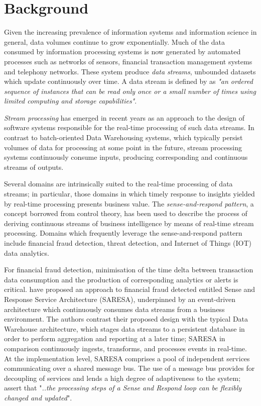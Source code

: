 \chapter{Background}

Given the increasing prevalence of information systems and information science in general, data volumes continue to grow exponentially\cite{Devakunchari}. Much of the data consumed by information processing systems is now generated by automated processes such as networks of sensors, financial transaction management systems and telephony networks. These system produce \textit{data streams}, unbounded datasets which update continuously over time. A data stream is defined by \citeauthor{data_stream_processing} as \textit{"an ordered sequence of instances that can be read only once or a small number of times using limited computing and storage capabilities"}\cite{data_stream_processing}.

\textit{Stream processing} has emerged in recent years as an approach to the design of software systems responsible for the real-time processing of such data streams\cite{Andrade:2014:FSP:2823980}. In contrast to batch-oriented Data Warehousing systems, which typically persist volumes of data for processing at some point in the future, stream processing systems continuously consume inputs, producing corresponding and continuous streams of outputs. 

Several domains are intrinsically suited to the real-time processing of data streams; in particular, those domains in which timely response to insights yielded by real-time processing presents business value. The \textit{sense-and-respond pattern}, a concept borrowed from control theory, has been used to describe the process of deriving continuous streams of business intelligence by means of real-time stream processing\cite{Nguyen:2005:SRS:1097002.1097015}. Domains which frequently leverage the sense-and-respond pattern include financial fraud detection, threat detection, and Internet of Things (IOT) data analytics.

For financial fraud detection, minimisation of the time delta between transaction data consumption and the production of corresponding analytics or alerts is critical. \citeauthor{Nguyen:2005:SRS:1097002.1097015} have proposed an approach to financial fraud detected entitled Sense and Response Service Architecture (SARESA), underpinned by an event-driven architecture which continuously consumes data streams from a business environment\cite{Nguyen:2005:SRS:1097002.1097015}. The authors contrast their proposed design with the typical Data Warehouse architecture, which stages data streams to a persistent database in order to perform aggregation and reporting at a later time; SARESA in comparison continuously ingests, transforms, and processes events in real-time. At the implementation level, SARESA comprises a pool of independent services communicating over a shared message bus. The use of a message bus provides for decoupling of services and lends a high degree of adaptiveness to the system;  \citeauthor{Nguyen:2005:SRS:1097002.1097015} assert that "\textit{..the processing steps of a Sense and Respond loop can be flexibly changed and updated}".

